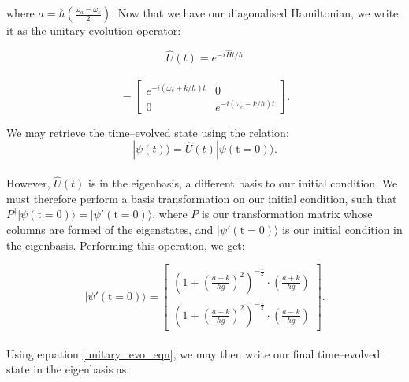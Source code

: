 \documentclass[12pt]{article}
\begin{document}
where $a = \hbar\left(\frac{\omega_a - \omega_c}{2}\right)$. Now that we have our diagonalised Hamiltonian, we write it as the unitary evolution operator:

\begin{equation*}
    \hat{U}(t) = e^{-i\hat{H}t/\hbar}
\end{equation*}
\\ 
\begin{equation*}
    = 
    \begin{bmatrix}
        e^{-i(\omega_c + k/\hbar)t} & 0 \\
        0 & e^{-i(\omega_c - k/\hbar)t}
    \end{bmatrix}.
\end{equation*}

We may retrieve the time--evolved state using the relation:
\begin{equation} \label{unitary_evo_eqn}
    |\psi(t)\rangle = \hat{U}(t)|\psi(\text{t}=0)\rangle.
\end{equation}
\\
However, $\hat{U}(t)$ is in the eigenbasis, a different basis to our initial condition. We must therefore perform a basis transformation on our initial condition, such that $P^\dagger|\psi(\text{t} = 0)\rangle = |\psi'(\text{t} = 0)\rangle$, where $P$ is our transformation matrix whose columns are formed of the eigenstates, and $|\psi'(\text{t} = 0)\rangle$ is our initial condition in the eigenbasis. Performing this operation, we get:

\begin{equation*}
    |\psi'(\text{t} = 0)\rangle = 
    \begin{bmatrix}
        \left(1 + \left(\frac{a + k}{\hbar g}\right)^2\right)^{-\frac{1}{2}}\cdot\left(\frac{a + k}{\hbar g}\right) \\
        \left(1 + \left(\frac{a - k}{\hbar g}\right)^2\right)^{-\frac{1}{2}}\cdot\left(\frac{a - k}{\hbar g}\right)
    \end{bmatrix}.
\end{equation*}
\\
Using equation \eqref{unitary_evo_eqn}, we may then write our final time--evolved state in the eigenbasis as:
\end{document}
